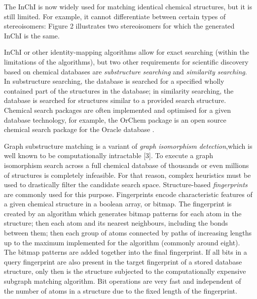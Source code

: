 \documentclass{sig-alternate}
\begin{document}

The InChI is now widely used for matching identical chemical structures, but it
is still limited. For example, it cannot differentiate between
certain types of stereoisomers: Figure 2 illustrates two stereoisomers for which
the generated InChI is the same.


InChI or other identity-mapping algorithms allow for exact searching (within the
limitations of the algorithms), but two other requirements for scientific
discovery based on chemical databases are \emph{substructure searching} and \emph{similarity
searching}. In substructure searching, the database is searched for a specified
wholly contained part of the structures in the database; in similarity
searching, the database is searched for structures similar to a provided search
structure. Chemical search packages are often implemented and optimised for a
given database technology, for example, the OrChem package is an open source
chemical search package for the Oracle database \cite{rijnbeek2009}.

Graph substructure matching is a variant of \emph{graph isomorphism detection},which is
well known to be computationally intractable [3]. To execute a graph isomorphism
search across a full chemical database of thousands or even millions of
structures is completely infeasible. For that reason, complex heuristics must be
used to drastically filter the candidate search space. Structure-based
\emph{fingerprints} are commonly used for this purpose. Fingerprints encode
characteristic features of a given chemical structure in a boolean array, or
bitmap. The fingerprint is created by an algorithm which generates bitmap
patterns for each atom in the structure; then each atom and its nearest
neighbours, including the bonds between them; then each group of atoms connected
by paths of increasing lengths up to the maximum implemented for the algorithm
(commonly around eight). The bitmap patterns are added together into the final
fingerprint. If all bits in a query fingerprint are also present in the target
fingerprint of a stored database structure, only then is the structure subjected
to the computationally expensive subgraph matching algorithm. Bit operations are
very fast and independent of the number of atoms in a structure due to the fixed
length of the fingerprint.
\end{document}
